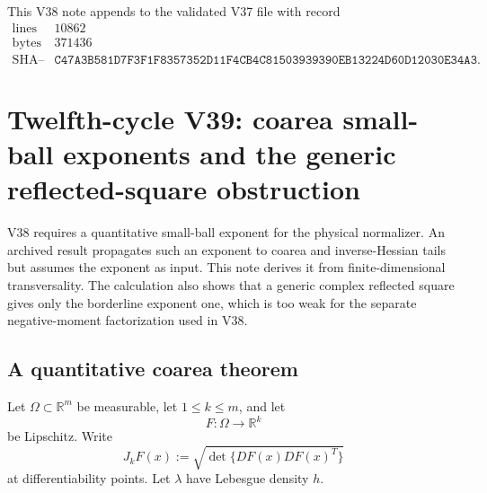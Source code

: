 \documentclass[11pt]{article}
\theoremstyle{remark}
\begin{document}
This V38 note appends to the validated V37 file with record
\[
\begin{array}{c|c}
\text{lines}&10862\\
\text{bytes}&371436\\
\text{SHA--256}&
\texttt{C47A3B581D7F3F1F8357352D11F4CB4C81503939390EB13224D60D12030E34A3}.
\end{array}
\]


\section{Twelfth-cycle V39: coarea small-ball exponents and the
generic reflected-square obstruction}
\label{sec:v12v39}

V38 requires a quantitative small-ball exponent for the physical
normalizer.  An archived result propagates such an exponent to
coarea and inverse-Hessian tails but assumes the exponent as input.
This note derives it from finite-dimensional transversality.  The
calculation also shows that a generic complex reflected square gives
only the borderline exponent one, which is too weak for the
separate negative-moment factorization used in V38.

\subsection{A quantitative coarea theorem}

Let \(\Omega\subset\mathbb R^m\) be measurable, let
\(1\leq k\leq m\), and let
\[
 F:\Omega\longrightarrow\mathbb R^k
\]
be Lipschitz.  Write
\[
 J_kF(x):=
 \sqrt{\det\{DF(x)DF(x)^T\}}
\]
at differentiability points.  Let \(\lambda\) have Lebesgue density
\(h\).
\end{document}
